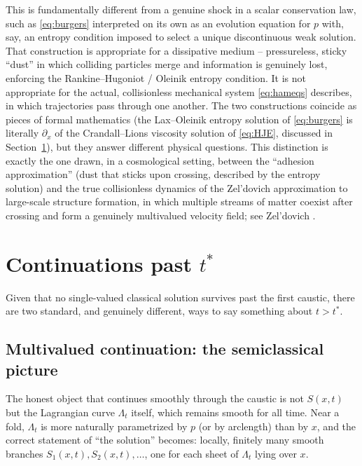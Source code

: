 \documentclass[11pt]{article}
\theoremstyle{plain}
\theoremstyle{definition}
\theoremstyle{remark}
\begin{document}
This is fundamentally different from a genuine shock in a scalar conservation
law, such as \eqref{eq:burgers} interpreted on its own as an evolution equation
for $p$ with, say, an entropy condition imposed to select a unique
discontinuous weak solution. That construction is appropriate for a dissipative
medium -- pressureless, sticky ``dust'' in which colliding particles merge and
information is genuinely lost, enforcing the Rankine--Hugoniot / Oleinik
entropy condition. It is not appropriate for the actual, collisionless
mechanical system \eqref{eq:hameqs} describes, in which trajectories pass
through one another. The two constructions coincide as pieces of formal
mathematics (the Lax--Oleinik entropy solution of \eqref{eq:burgers} is
literally $\partial_x$ of the Crandall--Lions viscosity solution of
\eqref{eq:HJE}, discussed in Section~\ref{sec:continuations}), but they answer
different physical questions. This distinction is exactly the one drawn, in a
cosmological setting, between the ``adhesion approximation'' (dust that sticks
upon crossing, described by the entropy solution) and the true collisionless
dynamics of the Zel'dovich approximation to large-scale structure formation, in
which multiple streams of matter coexist after crossing and form a genuinely
multivalued velocity field; see Zel'dovich \cite{Zeldovich}.

\section{Continuations past \texorpdfstring{$t^\ast$}{t*}}
\label{sec:continuations}

Given that no single-valued classical solution survives past the first caustic,
there are two standard, and genuinely different, ways to say something about
$t>t^\ast$.

\subsection{Multivalued continuation: the semiclassical picture}

The honest object that continues smoothly through the caustic is not $S(x,t)$
but the Lagrangian curve $\Lambda_t$ itself, which remains smooth for all time.
Near a fold, $\Lambda_t$ is more naturally parametrized by $p$ (or by
arclength) than by $x$, and the correct statement of ``the solution'' becomes:
locally, finitely many smooth branches $S_1(x,t),S_2(x,t),\dots$, one for each
sheet of $\Lambda_t$ lying over $x$.
\end{document}
